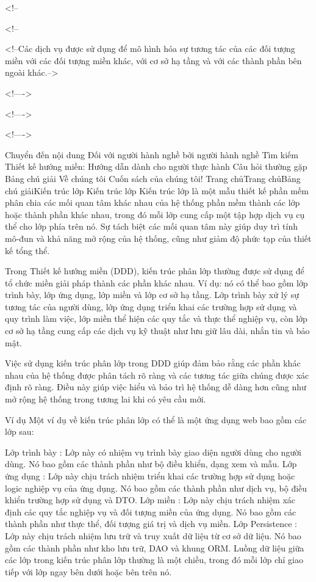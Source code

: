 <!-- %


<!-- %









<!--Các dịch vụ được sử dụng để mô hình hóa sự tương tác của các đối tượng miền với các đối tượng miền khác, với cơ sở hạ tầng và với các thành phần bên ngoài khác.-->


<!---->

<!---->

<!---->


Chuyển đến nội dung
Đối với người hành nghề bởi người hành nghề
Tìm kiếm
Thiết kế hướng miền: Hướng dẫn dành cho người thực hành
Câu hỏi thường gặp
Bảng chú giải
Về chúng tôi
Cuốn sách của chúng tôi!
Trang chủTrang chủBảng chú giảiKiến trúc lớp
Kiến trúc lớp
Kiến trúc lớp là một mẫu thiết kế phần mềm phân chia các mối quan tâm khác nhau của hệ thống phần mềm thành các lớp hoặc thành phần khác nhau, trong đó mỗi lớp cung cấp một tập hợp dịch vụ cụ thể cho lớp phía trên nó. Sự tách biệt các mối quan tâm này giúp duy trì tính mô-đun và khả năng mở rộng của hệ thống, cũng như giảm độ phức tạp của thiết kế tổng thể.

Trong Thiết kế hướng miền (DDD), kiến ​​trúc phân lớp thường được sử dụng để tổ chức miền giải pháp thành các phần khác nhau. Ví dụ: nó có thể bao gồm lớp trình bày, lớp ứng dụng, lớp miền và lớp cơ sở hạ tầng. Lớp trình bày xử lý sự tương tác của người dùng, lớp ứng dụng triển khai các trường hợp sử dụng và quy trình làm việc, lớp miền thể hiện các quy tắc và thực thể nghiệp vụ, còn lớp cơ sở hạ tầng cung cấp các dịch vụ kỹ thuật như lưu giữ lâu dài, nhắn tin và bảo mật.

Việc sử dụng kiến ​​trúc phân lớp trong DDD giúp đảm bảo rằng các phần khác nhau của hệ thống được phân tách rõ ràng và các tương tác giữa chúng được xác định rõ ràng. Điều này giúp việc hiểu và bảo trì hệ thống dễ dàng hơn cũng như mở rộng hệ thống trong tương lai khi có yêu cầu mới.

Ví dụ
Một ví dụ về kiến ​​trúc phân lớp có thể là một ứng dụng web bao gồm các lớp sau:

Lớp trình bày : Lớp này có nhiệm vụ trình bày giao diện người dùng cho người dùng. Nó bao gồm các thành phần như bộ điều khiển, dạng xem và mẫu.
Lớp ứng dụng : Lớp này chịu trách nhiệm triển khai các trường hợp sử dụng hoặc logic nghiệp vụ của ứng dụng. Nó bao gồm các thành phần như dịch vụ, bộ điều khiển trường hợp sử dụng và DTO.
Lớp miền : Lớp này chịu trách nhiệm xác định các quy tắc nghiệp vụ và đối tượng miền của ứng dụng. Nó bao gồm các thành phần như thực thể, đối tượng giá trị và dịch vụ miền.
Lớp Persistence : Lớp này chịu trách nhiệm lưu trữ và truy xuất dữ liệu từ cơ sở dữ liệu. Nó bao gồm các thành phần như kho lưu trữ, DAO và khung ORM.
Luồng dữ liệu giữa các lớp trong kiến ​​trúc phân lớp thường là một chiều, trong đó mỗi lớp chỉ giao tiếp với lớp ngay bên dưới hoặc bên trên nó.

